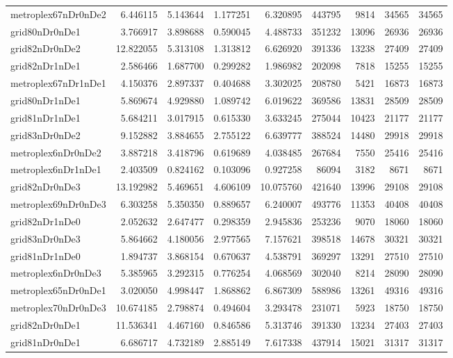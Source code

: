 \begin{longtable}{|l|r|r|r|r|r|r|r|r|}
metroplex67nDr0nDe2 & 6.446115 & 5.143644 & 1.177251 & 6.320895 & 443795 & 9814 & 34565 & 34565 \\
grid80nDr0nDe1 & 3.766917 & 3.898688 & 0.590045 & 4.488733 & 351232 & 13096 & 26936 & 26936 \\
grid82nDr0nDe2 & 12.822055 & 5.313108 & 1.313812 & 6.626920 & 391336 & 13238 & 27409 & 27409 \\
grid82nDr1nDe1 & 2.586466 & 1.687700 & 0.299282 & 1.986982 & 202098 & 7818 & 15255 & 15255 \\
metroplex67nDr1nDe1 & 4.150376 & 2.897337 & 0.404688 & 3.302025 & 208780 & 5421 & 16873 & 16873 \\
grid80nDr1nDe1 & 5.869674 & 4.929880 & 1.089742 & 6.019622 & 369586 & 13831 & 28509 & 28509 \\
grid81nDr1nDe1 & 5.684211 & 3.017915 & 0.615330 & 3.633245 & 275044 & 10423 & 21177 & 21177 \\
grid83nDr0nDe2 & 9.152882 & 3.884655 & 2.755122 & 6.639777 & 388524 & 14480 & 29918 & 29918 \\
metroplex6nDr0nDe2 & 3.887218 & 3.418796 & 0.619689 & 4.038485 & 267684 & 7550 & 25416 & 25416 \\
metroplex6nDr1nDe1 & 2.403509 & 0.824162 & 0.103096 & 0.927258 & 86094 & 3182 & 8671 & 8671 \\
grid82nDr0nDe3 & 13.192982 & 5.469651 & 4.606109 & 10.075760 & 421640 & 13996 & 29108 & 29108 \\
metroplex69nDr0nDe3 & 6.303258 & 5.350350 & 0.889657 & 6.240007 & 493776 & 11353 & 40408 & 40408 \\
grid82nDr1nDe0 & 2.052632 & 2.647477 & 0.298359 & 2.945836 & 253236 & 9070 & 18060 & 18060 \\
grid83nDr0nDe3 & 5.864662 & 4.180056 & 2.977565 & 7.157621 & 398518 & 14678 & 30321 & 30321 \\
grid81nDr1nDe0 & 1.894737 & 3.868154 & 0.670637 & 4.538791 & 369297 & 13291 & 27510 & 27510 \\
metroplex6nDr0nDe3 & 5.385965 & 3.292315 & 0.776254 & 4.068569 & 302040 & 8214 & 28090 & 28090 \\
metroplex65nDr0nDe1 & 3.020050 & 4.998447 & 1.868862 & 6.867309 & 588986 & 13261 & 49316 & 49316 \\
metroplex70nDr0nDe3 & 10.674185 & 2.798874 & 0.494604 & 3.293478 & 231071 & 5923 & 18750 & 18750 \\
grid82nDr0nDe1 & 11.536341 & 4.467160 & 0.846586 & 5.313746 & 391330 & 13234 & 27403 & 27403 \\
grid81nDr0nDe1 & 6.686717 & 4.732189 & 2.885149 & 7.617338 & 437914 & 15021 & 31317 & 31317 \\

\end{longtable}
